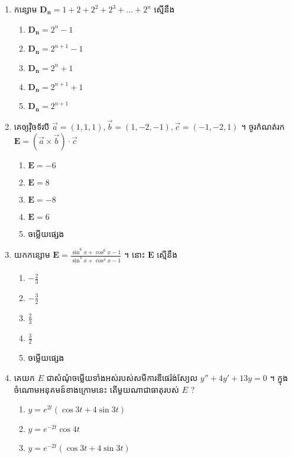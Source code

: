 \documentclass[12pt, a4paper]{article}
\begin{document}
\maketitle\koc
{\color{blue}\hrulefill}
\begin{enumerate}[m]
	 \item កន្សោម $\mathbf{D_n}=1+2+2^2+2^3+\dots+2^n$ ស្មើនឹង
	 \begin{enumerate}[k,5]
	 	\item $\mathbf{D_n}=2^n-1$
	 	\item $\mathbf{D_n}=2^{n+1}-1$
	 	\item $\mathbf{D_n}=2^n+1$
	 	\item $\mathbf{D_n}=2^{n+1}+1$
	 	\item $\mathbf{D_n}=2^{n+1}$
	 \end{enumerate}
	 {\color{blue}\hrulefill}
 	\item គេឲ្យវ៉ិចទ័របី $\vec{a}=(1,1,1), \vec{b}=(1,-2,-1), \vec{c}=(-1,-2,1)$ ។ ចូរកំណត់រក $\mathbf{E}=\left(\vec{a}\times\vec{b}\right)\cdot\vec{c}$
 	\begin{enumerate}[k,5]
 		\item $\mathbf{E}=-6$
 		\item $\mathbf{E}=8$
 		\item $\mathbf{E}=-8$
 		\item $\mathbf{E}=6$
 		\item ចម្លើយផ្សេង
 	\end{enumerate}
 	{\color{blue}\hrulefill}
 	\item យកកន្សោម $\mathbf{E}=\frac{\sin^6x+\cos^6x-1}{\sin^4x+\cos^4x-1}$ ។ នោះ $\mathbf{E}$ ស្មើនឹង 
 	\begin{enumerate}[k,5]
 		\item $-\frac{2}{3}$
 		\item $-\frac{3}{2}$
 		\item $\frac{2}{3}$
 		\item $\frac{3}{2}$
 		\item ចម្លើយផ្សេង
 	\end{enumerate}
 	{\color{blue}\hrulefill}
 	\item គេយក $E$ ជាសំណុំចម្លើយទាំងអស់របស់សមីការឌីផេរ៉ង់ស្យែល $y''+4y'+13y=0$ ។ ក្នុងចំណោមអនុគមន៍ខាងក្រោមនេះ តើមួយណាជាធាតុរបស់ $E$ ?
 	\begin{enumerate}[k,3]
 		\item $y=e^{2t}\left(\cos3t+4\sin3t\right)$
 		\item $y=e^{-2t}\cos4t$
 		\item $y=e^{-2t}\left(\cos3t+4\sin3t\right)$

\end{enumerate}
\end{enumerate}
\end{document}
